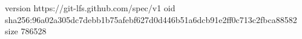 version https://git-lfs.github.com/spec/v1
oid sha256:96a02a305dc7debb1b75afebf627d0d446b51a6dcb91e2ff0c713c2fbca88582
size 786528

